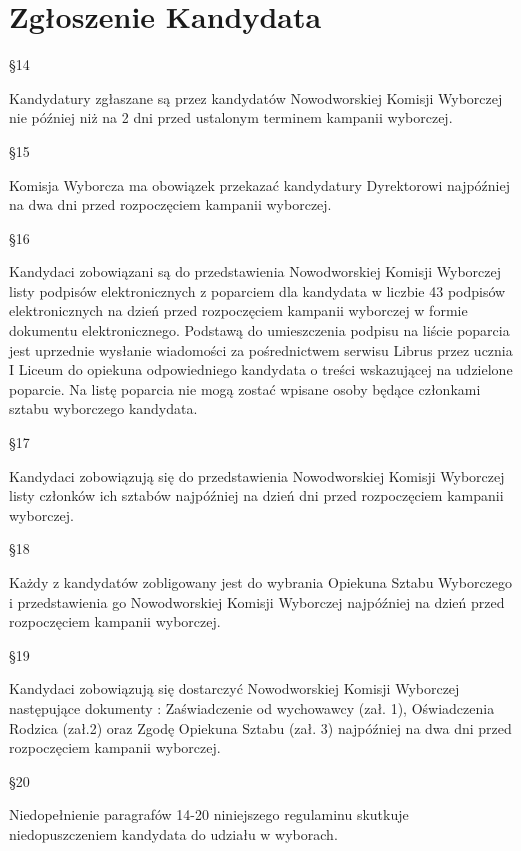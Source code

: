 \documentclass[12pt]{article}
\begin{document}
\section{Zgłoszenie Kandydata}
    \begin{center}
        \S 14\\
    \end{center} 
    Kandydatury zgłaszane są przez kandydatów Nowodworskiej  Komisji Wyborczej nie później niż  na 2 dni przed ustalonym terminem kampanii wyborczej.\\
    \begin{center}
        \S 15\\
    \end{center} 
    Komisja Wyborcza ma obowiązek przekazać kandydatury Dyrektorowi najpóźniej na dwa dni przed rozpoczęciem kampanii wyborczej.\\
    \begin{center}
        \S 16\\
    \end{center} 
    Kandydaci zobowiązani są do przedstawienia Nowodworskiej Komisji Wyborczej listy podpisów elektronicznych z poparciem dla kandydata w liczbie 43 podpisów elektronicznych na dzień przed rozpoczęciem kampanii wyborczej w formie dokumentu elektronicznego. Podstawą do umieszczenia podpisu na liście poparcia jest uprzednie wysłanie wiadomości za pośrednictwem serwisu Librus przez ucznia I Liceum do opiekuna odpowiedniego kandydata o treści wskazującej na udzielone poparcie. Na listę poparcia nie mogą zostać wpisane osoby będące członkami sztabu wyborczego kandydata.\\
    \begin{center}
        \S 17\\
    \end{center} 
    Kandydaci zobowiązują się do przedstawienia Nowodworskiej Komisji Wyborczej  listy członków ich sztabów najpóźniej na dzień dni przed rozpoczęciem kampanii wyborczej.\\
    \begin{center}
        \S 18\\
    \end{center} 
    Każdy z kandydatów zobligowany jest do wybrania Opiekuna Sztabu Wyborczego i przedstawienia go  Nowodworskiej Komisji Wyborczej najpóźniej na dzień przed rozpoczęciem kampanii wyborczej.\\
    \begin{center}
        \S 19\\
    \end{center} 
    Kandydaci zobowiązują się dostarczyć Nowodworskiej Komisji Wyborczej następujące dokumenty : Zaświadczenie od wychowawcy (zał. 1), Oświadczenia  Rodzica  (zał.2)  oraz Zgodę Opiekuna Sztabu (zał. 3) najpóźniej na dwa dni przed rozpoczęciem kampanii wyborczej.\\
    \begin{center}
        \S 20\\
    \end{center} 
    Niedopełnienie paragrafów 14-20 niniejszego regulaminu skutkuje niedopuszczeniem kandydata do udziału w wyborach.\\
\end{document}
